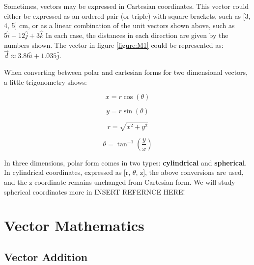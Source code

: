 	Sometimes, vectors may be expressed in Cartesian coordinates.  This vector could either be expressed as an ordered pair (or triple) with square brackets, such as [3, 4, 5] cm, or as a linear combination of the unit vectors shown above, such as $5\hat{i} + 12 \hat{j} + 3 \hat{k}$  In each case, the distances in each direction are given by the numbers shown.  The vector in figure \ref{figure:M1} could be represented as: \color{blue} $\vec{d}  \approx 3.86 \hat{i} + 1.035 \hat{j}$.  \color{black}
	
	When converting between polar and cartesian forms for two dimensional vectors, a little trigonometry shows: 
		\begin{mdframed}[backgroundcolor=orange!20!white]
	
	\color{blue}
	\begin{multicols}{2}
		\begin{center}
			\begin{equation}
			x = r \cos(\theta)
			\label{eq11}
			\end{equation}
			
			\begin{equation}
			y = r \sin(\theta)
			\end{equation}

			\begin{equation}
			r = \sqrt{x^2+y^2}			
			\end{equation}

			\begin{equation}
			\theta=\tan^{-1}(\frac{y}{x})
			\label{eq14}
			\end{equation}		
		\end{center}
	\end{multicols}
	\color{black}
	\end{mdframed}
	
	In three dimensions, polar form comes in two types: \textbf{cylindrical} and \textbf{spherical}.  In cylindrical coordinates, expressed as [r, $\theta$, z],  the above conversions are used, and the z-coordinate remains unchanged from Cartesian form.  We will study spherical coordinates more in \color{red} INSERT REFERNCE HERE! \color{black}

	
	
	
	
\section{Vector Mathematics}
	\subsection{Vector Addition} 
